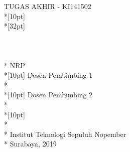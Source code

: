 \newpage

	\sffamily
	\thispagestyle{empty}
	\color{white}
	{ \noindent TUGAS AKHIR - KI141502 }\\*[10pt] 
	{\large\textbf{\MakeUppercase{\judul}}} \\*[32pt]
	\\
	\\
	\\
	\MakeUppercase{\penulis} \\*
	NRP \nrp \\*[10pt]
	Dosen Pembimbing 1 \\*
	\pembimbingsatu \\*[10pt]
	Dosen Pembimbing 2 \\*
	\pembimbingdua \\*[10pt]
	\MakeUppercase{\jurusan} \\*
	\fakultas \\*
	Institut Teknologi Sepuluh Nopember \\*
	Surabaya, 2019
	\rmfamily
	\normalsize
	\restoregeometry
	\color{black}
	\cleardoublepage
	
